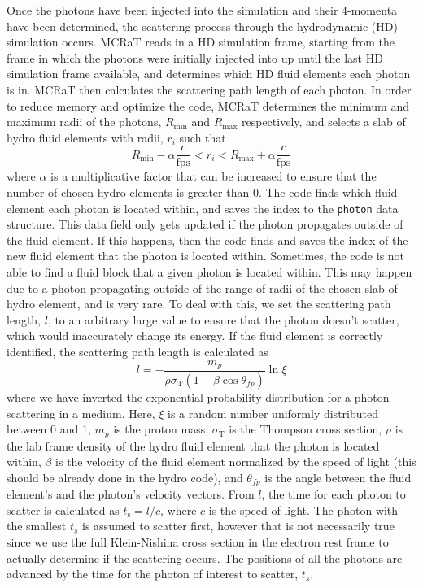 \documentclass[12pt,a4paper]{article}
\begin{document}
Once the photons have been injected into the simulation and their 4-momenta have been determined, the scattering process through the hydrodynamic (HD) simulation occurs. MCRaT reads in a HD simulation frame, starting from the frame in which the photons were initially injected into up until the last HD simulation frame available, and determines which HD fluid elements each photon is in. MCRaT then calculates the scattering path length of each photon. In order to reduce memory and optimize the code, MCRaT determines the minimum and maximum radii of the photons, $R_\mathrm{min}$ and $R_\mathrm{max}$ respectively, and selects a slab of hydro fluid elements with radii, $r_i$ such that 
\[
R_\mathrm{min}-\alpha\frac{c}{\mathrm{fps}} < r_i < R_\mathrm{max}+\alpha\frac{c}{\mathrm{fps}} 
\] 
where $\alpha$ is a multiplicative factor that can be increased to ensure that the number of chosen hydro elements is greater than 0. The code finds which fluid element each photon is located within, and saves the index to the \texttt{photon} data structure. This data field only gets updated if the photon propagates outside of the fluid element. If this happens, then the code finds and saves the index of the new fluid element that the photon is located within. Sometimes, the code is not able to find a fluid block that a given photon is located within. This may happen due to a photon propagating outside of the range of radii of the chosen slab of hydro element, and is very rare. To deal with this, we set the scattering path length, $l$, to an arbitrary large value to ensure that the photon doesn't scatter, which would inaccurately change its energy. If the fluid element is correctly identified, the scattering path length is calculated as  
\[
l=-\frac{m_p}{\rho\sigma_\mathrm{T}(1-\beta\cos\theta_{fp})}\ln\xi
\]
where we have inverted the exponential probability distribution for a photon scattering in a medium. Here, $\xi$ is a random number uniformly distributed between 0 and 1, $m_p$ is the proton mass, $\sigma_\mathrm{T}$ is the Thompson cross section, $\rho$ is the lab frame density of the hydro fluid element that the photon is located within, $\beta$ is the velocity of the fluid element normalized by the speed of light (this should be already done in the hydro code), and $\theta_{fp}$ is the angle between the fluid element's and the photon's velocity vectors. From $l$, the time for each photon to scatter is calculated as $t_\mathrm{s}=l/c$, where $c$ is the speed of light. The photon with the smallest $t_s$ is assumed to scatter first, however that is not necessarily true since we use the full Klein-Nishina cross section in the electron rest frame to actually determine if the scattering occurs. The positions of all the photons are advanced by the time for the photon of interest to scatter, $t_s$.
\end{document}
